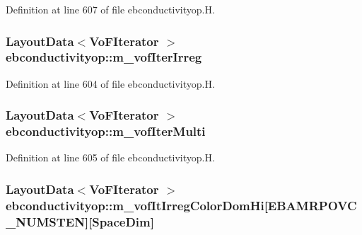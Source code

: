 Definition at line 607 of file ebconductivityop.\+H.

\subsubsection[{\texorpdfstring{m\+\_\+vof\+Iter\+Irreg}{m_vofIterIrreg}}]{\setlength{\rightskip}{0pt plus 5cm}Layout\+Data$<$Vo\+F\+Iterator $>$ ebconductivityop\+::m\+\_\+vof\+Iter\+Irreg\hspace{0.3cm}{\ttfamily [protected]}}\hypertarget{classebconductivityop_a8b503f34a1dc5a34cc591fd1ad3a65d8}{}\label{classebconductivityop_a8b503f34a1dc5a34cc591fd1ad3a65d8}


Definition at line 604 of file ebconductivityop.\+H.

\subsubsection[{\texorpdfstring{m\+\_\+vof\+Iter\+Multi}{m_vofIterMulti}}]{\setlength{\rightskip}{0pt plus 5cm}Layout\+Data$<$Vo\+F\+Iterator $>$ ebconductivityop\+::m\+\_\+vof\+Iter\+Multi\hspace{0.3cm}{\ttfamily [protected]}}\hypertarget{classebconductivityop_aabb108186c19d716777d854786c9740e}{}\label{classebconductivityop_aabb108186c19d716777d854786c9740e}


Definition at line 605 of file ebconductivityop.\+H.

\subsubsection[{\texorpdfstring{m\+\_\+vof\+It\+Irreg\+Color\+Dom\+Hi}{m_vofItIrregColorDomHi}}]{\setlength{\rightskip}{0pt plus 5cm}Layout\+Data$<$Vo\+F\+Iterator $>$ ebconductivityop\+::m\+\_\+vof\+It\+Irreg\+Color\+Dom\+Hi\mbox{[}E\+B\+A\+M\+R\+P\+O\+V\+C\+\_\+\+N\+U\+M\+S\+T\+EN\mbox{]}\mbox{[}Space\+Dim\mbox{]}\hspace{0.3cm}{\ttfamily [protected]}}\hypertarget{classebconductivityop_a9c554e73bfc4b1a1347047224a20ba79}{}\label{classebconductivityop_a9c554e73bfc4b1a1347047224a20ba79}



